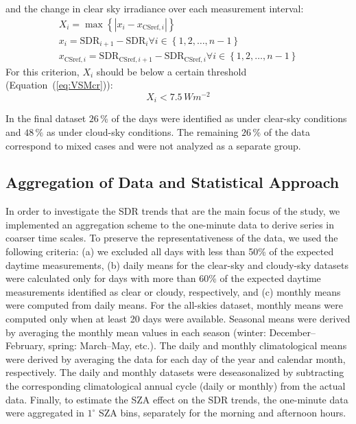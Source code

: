 \documentclass[applsci,article,submit,moreauthors,pdftex]{Definitions/mdpi}
\begin{document}
\begin{enumerate}
  and the change in clear sky irradiance over each measurement interval:
  \begin{gather}
    X_i = \max{\left \{ \left | x_i - x_{\text{CSref},i} \right | \right \}} \label{eq:VSM3} \\
    x_i = \text{SDR}_{i+1} - \text{SDR}_{i} \forall i \in \left \{ 1, 2, \ldots, n-1 \right \} \label{eq:VSM1} \\
    x_{\text{CSref},i} = \text{SDR}_{\text{CSref},i+1} - \text{SDR}_{\text{CSref},i} \forall i \in \left \{ 1, 2, \ldots, n-1 \right \} \label{eq:VSM2}
  \end{gather} For this criterion, \(X_i\) should be below a certain
  threshold (Equation~(\ref{eq:VSMcr})): \begin{equation}
    X_i < 7.5\,Wm^{-2} \label{eq:VSMcr}
  \end{equation}
\end{enumerate}

In the final dataset \(26\,\%\) of the days were identified as under
clear-sky conditions and \(48\,\%\) as under cloud-sky conditions. The
remaining \(26\,\%\) of the data correspond to mixed cases and were not
analyzed as a separate group.

\hypertarget{aggregationstatistical}{%
\subsection{Aggregation of Data and Statistical
Approach}\label{aggregationstatistical}}

In order to investigate the SDR trends that are the main focus of the
study, we implemented an aggregation scheme to the one-minute data to
derive series in coarser time scales. To preserve the representativeness
of the data, we used the following criteria: (a) we excluded all days
with less than 50\% of the expected daytime measurements, (b) daily
means for the clear-sky and cloudy-sky datasets were calculated only for
days with more than 60\% of the expected daytime measurements identified
as clear or cloudy, respectively, and (c) monthly means were computed
from daily means. For the all-skies dataset, monthly means were computed
only when at least 20 days were available. Seasonal means were derived
by averaging the monthly mean values in each season (winter:
December--February, spring: March--May, etc.). The daily and monthly
climatological means were derived by averaging the data for each day of
the year and calendar month, respectively. The daily and monthly
datasets were deseasonalized by subtracting the corresponding
climatological annual cycle (daily or monthly) from the actual data.
Finally, to estimate the SZA effect on the SDR trends, the one-minute
data were aggregated in \(1^{\circ}\) SZA bins, separately for the
morning and afternoon hours.
\end{document}
